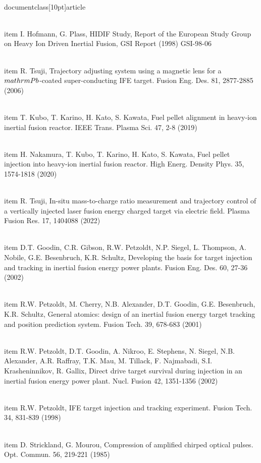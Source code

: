 \\documentclass[10pt]{article}
\begin{document}
{{{{{{  \\item I. Hofmann, G. Plass, HIDIF Study, Report of the European Study Group on Heavy Ion Driven Inertial Fusion, GSI Report (1998) GSI-98-06

  \\item R. Tsuji, Trajectory adjusting system using a magnetic lens for a $\\mathrm{Pb}$-coated super-conducting IFE target. Fusion Eng. Des. 81, 2877-2885 (2006)

  \\item T. Kubo, T. Karino, H. Kato, S. Kawata, Fuel pellet alignment in heavy-ion inertial fusion reactor. IEEE Trans. Plasma Sci. 47, 2-8 (2019)

  \\item H. Nakamura, T. Kubo, T. Karino, H. Kato, S. Kawata, Fuel pellet injection into heavy-ion inertial fusion reactor. High Energ. Density Phys. 35, 1574-1818 (2020)

  \\item R. Tsuji, In-situ mass-to-charge ratio measurement and trajectory control of a vertically injected laser fusion energy charged target via electric field. Plasma Fusion Res. 17, 1404088 (2022)

  \\item D.T. Goodin, C.R. Gibson, R.W. Petzoldt, N.P. Siegel, L. Thompson, A. Nobile, G.E. Besenbruch, K.R. Schultz, Developing the basis for target injection and tracking in inertial fusion energy power plants. Fusion Eng. Des. 60, 27-36 (2002)

  \\item R.W. Petzoldt, M. Cherry, N.B. Alexander, D.T. Goodin, G.E. Besenbruch, K.R. Schultz, General atomics: design of an inertial fusion energy target tracking and position prediction system. Fusion Tech. 39, 678-683 (2001)

  \\item R.W. Petzoldt, D.T. Goodin, A. Nikroo, E. Stephens, N. Siegel, N.B. Alexander, A.R. Raffray, T.K. Mau, M. Tillack, F. Najmabadi, S.I. Krasheninnikov, R. Gallix, Direct drive target survival during injection in an inertial fusion energy power plant. Nucl. Fusion 42, 1351-1356 (2002)

  \\item R.W. Petzoldt, IFE target injection and tracking experiment. Fusion Tech. 34, 831-839 (1998)

  \\item D. Strickland, G. Mourou, Compression of amplified chirped optical pulses. Opt. Commun. 56, 219-221 (1985)

}}}}}}
\end{document}
